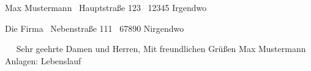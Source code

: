 \documentclass{documentclass/ab}
\begin{document}
        \begin{myaddress}
                Max Mustermann~
                Hauptstraße 123~
                12345 Irgendwo
        \end{myaddress}

        \begin{theiraddress}
                Die Firma~
                Nebenstraße 111~
                67890 Nirgendwo
        \end{theiraddress}

        \date{Irgendwo, den 32.13.1984}

        \subject{Bewerbung als Jedi}

        \begin{app}
                $\quad$
                Sehr geehrte Damen und Herren,\vspace{.5cm}
                \blindtext[1]\vspace{.5cm}
                \blindtext[1]\vspace{.5cm}
                \blindtext[1]\vspace{.5cm}
                Mit freundlichen Grüßen\vspace{1.5cm}
                Max Mustermann\vspace{3cm}
                Anlagen:
                Lebenslauf
        \end{app}
\end{document}
